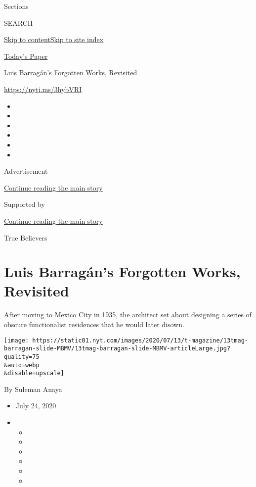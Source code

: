Sections

SEARCH

\protect\hyperlink{site-content}{Skip to
content}\protect\hyperlink{site-index}{Skip to site index}

\href{https://myaccount.nytimes.com/auth/login?response_type=cookie\&client_id=vi}{}

\href{https://www.nytimes.com/section/todayspaper}{Today's Paper}

Luis Barragán's Forgotten Works, Revisited

\url{https://nyti.ms/3hybVRI}

\begin{itemize}
\item
\item
\item
\item
\item
\item
\end{itemize}

Advertisement

\protect\hyperlink{after-top}{Continue reading the main story}

Supported by

\protect\hyperlink{after-sponsor}{Continue reading the main story}

True Believers

\hypertarget{luis-barraguxe1ns-forgotten-works-revisited}{%
\section{Luis Barragán's Forgotten Works,
Revisited}\label{luis-barraguxe1ns-forgotten-works-revisited}}

After moving to Mexico City in 1935, the architect set about designing a
series of obscure functionalist residences that he would later disown.

\texttt{[image: https://static01.nyt.com/images/2020/07/13/t-magazine/13tmag-barragan-slide-MBMV/13tmag-barragan-slide-MBMV-articleLarge.jpg?quality=75\\\&auto=webp\\\&disable=upscale]}

By Suleman Anaya

\begin{itemize}
\item
  July 24, 2020
\item
  \begin{itemize}
  \item
  \item
  \item
  \item
  \item
  \item
  \end{itemize}
\end{itemize}

